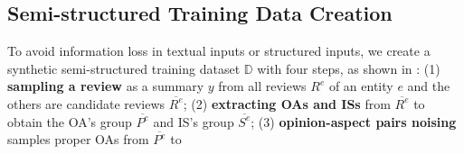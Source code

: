 \subsection{Semi-structured Training Data Creation}
\label{sec:data}
To avoid information loss in textual inputs or structured inputs,
we create a synthetic semi-structured training dataset $\mathbb{D}$ with four steps, 
as shown in : 
(1) \textbf{sampling a review} as a summary $y$ from all reviews $R^e$ of an entity $e$ and the others are candidate reviews $\overline{R^e}$; 
(2) \textbf{extracting OAs and ISs} from $\overline{R^e}$ to 
obtain the OA's group $\overline{P^e}$
and IS's group $\overline{S^e}$;
(3) {\bf opinion-aspect pairs noising} samples proper OAs from $\overline{P^e}$ to 
